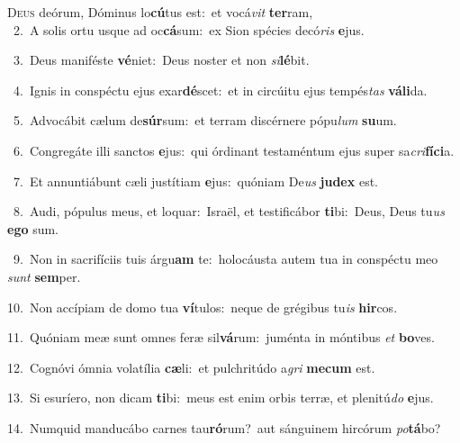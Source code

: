 \lettrine{\initial\textcolor{\initialcolor}{D}}{eus} deórum, Dóminus lo\-\textbf{cú}\-tus est:~\star et vocá\textit{vit} \textbf{ter}\-ram,\\
{\numbfont\textcolor{\numbcolor}{~2.}}~A solis ortu usque ad oc\-\textbf{cá}\-sum:~\star ex Sion spécies decó\textit{ris} \textbf{e}\-jus.\par
{\numbfont\textcolor{\numbcolor}{~3.}}~Deus maniféste \textbf{vé}\-niet:~\star Deus noster et non \textit{si}\-\textbf{lé}bit.\par
{\numbfont\textcolor{\numbcolor}{~4.}}~Ignis in conspéctu ejus exar\-\textbf{dé}\-scet:~\star et in circúitu ejus tempés\textit{tas} \textbf{vá}\-\textbf{li}da.\par
{\numbfont\textcolor{\numbcolor}{~5.}}~Advocábit cælum de\-\textbf{súr}\-sum:~\star et terram discérnere pópu\textit{lum} \textbf{su}\-um.\par
{\numbfont\textcolor{\numbcolor}{~6.}}~Congregáte illi sanctos \textbf{e}\-jus:~\star qui órdinant testaméntum ejus super sa\-\textit{cri}\-\textbf{fí}\textbf{ci}a.\par
{\numbfont\textcolor{\numbcolor}{~7.}}~Et annuntiábunt cæli justítiam \textbf{e}\-jus:~\star quóniam De\textit{us} \textbf{ju}\-\textbf{dex} est.\par
{\numbfont\textcolor{\numbcolor}{~8.}}~Audi, pópulus meus, et loquar:~\dagger Israël, et testificábor \textbf{ti}\-bi:~\star Deus, Deus tu\textit{us} \textbf{e}\-\textbf{go} sum.\par
{\numbfont\textcolor{\numbcolor}{~9.}}~Non in sacrifíciis tuis árgu\textbf{am} te:~\star holocáusta autem tua in conspéctu meo \textit{sunt} \textbf{sem}\-per.\par
{\numbfont\textcolor{\numbcolor}{10.}}~Non accípiam de domo tua \textbf{ví}\-tulos:~\star neque de grégibus tu\textit{is} \textbf{hir}\-cos.\par
{\numbfont\textcolor{\numbcolor}{11.}}~Quóniam meæ sunt omnes feræ sil\-\textbf{vá}\-rum:~\star juménta in móntibus \textit{et} \textbf{bo}\-ves.\par
{\numbfont\textcolor{\numbcolor}{12.}}~Cognóvi ómnia volatília \textbf{cæ}\-li:~\star et pulchritúdo a\textit{gri} \textbf{me}\-\textbf{cum} est.\par
{\numbfont\textcolor{\numbcolor}{13.}}~Si esuríero, non dicam \textbf{ti}\-bi:~\star meus est enim orbis terræ, et plenitú\textit{do} \textbf{e}\-jus.\par
{\numbfont\textcolor{\numbcolor}{14.}}~Numquid manducábo carnes tau\-\textbf{ró}\-rum?~\star aut sánguinem hircórum \textit{po}\-\textbf{tá}bo?\par
